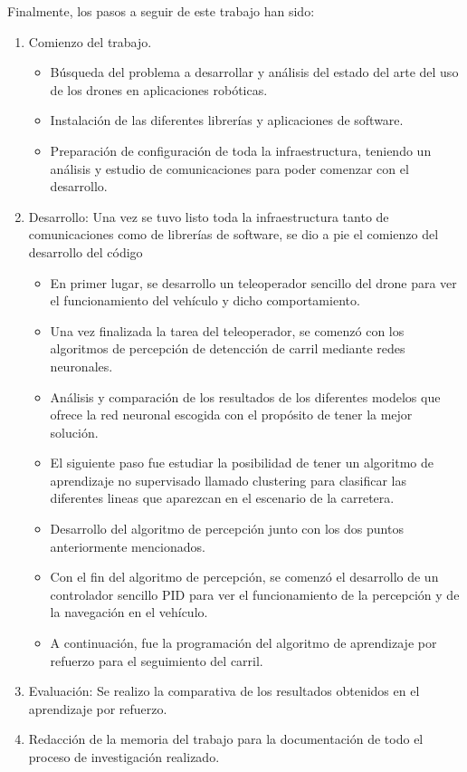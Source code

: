 Finalmente, los pasos a seguir de este trabajo han sido: 
\begin{enumerate}
    \item Comienzo del trabajo. 
    \begin{itemize}
        \item Búsqueda del problema a desarrollar y análisis del estado del arte del uso de los drones en aplicaciones robóticas.
        \item Instalación de las diferentes librerías y aplicaciones de software. 
        \item Preparación de configuración de toda la infraestructura, teniendo un análisis y estudio de comunicaciones para poder comenzar con el desarrollo. 
    \end{itemize}
    \item Desarrollo: Una vez se tuvo listo toda la infraestructura tanto de comunicaciones como de librerías de software, se dio a pie el comienzo del desarrollo del código
        \begin{itemize}
            \item En primer lugar, se desarrollo un teleoperador sencillo del drone para ver el funcionamiento del vehículo y dicho comportamiento.
            \item Una vez finalizada la tarea del teleoperador, se comenzó con los algoritmos de percepción de detencción de carril mediante redes neuronales.
            \item Análisis y comparación de los resultados de los diferentes modelos que ofrece la red neuronal escogida con el propósito de tener la mejor solución. 
            \item El siguiente paso fue estudiar la posibilidad de tener un algoritmo de aprendizaje no supervisado llamado clustering para clasificar las diferentes lineas que aparezcan en el escenario de la carretera.
            \item Desarrollo del algoritmo de percepción junto con los dos puntos anteriormente mencionados.
            \item Con el fin del algoritmo de percepción, se comenzó el desarrollo de un controlador sencillo PID para ver el funcionamiento de la percepción y de la navegación en el vehículo. 
            \item A continuación, fue la programación del algoritmo de aprendizaje por refuerzo para el seguimiento del carril.
        \end{itemize}
    \item Evaluación: Se realizo la comparativa de los resultados obtenidos en el aprendizaje por refuerzo.
        
    \item Redacción de la memoria del trabajo para la documentación de todo el proceso de investigación realizado. 
\end{enumerate}


